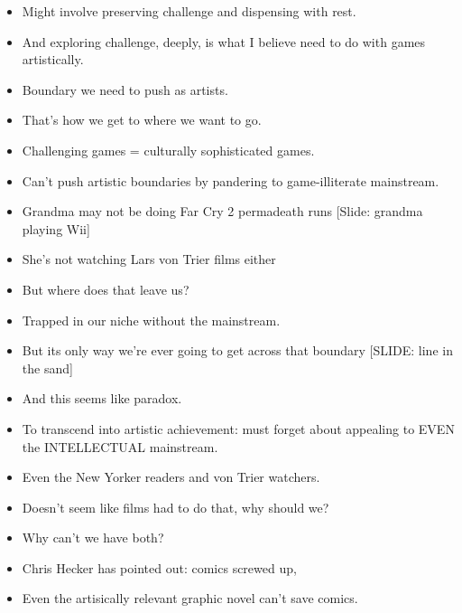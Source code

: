 \documentclass[12pt]{article}
\begin{document}
{\begin{itemize}
\item Might involve preserving challenge and dispensing with rest.

\item And exploring challenge, deeply, is what I believe need to do with games artistically.  

\item Boundary we need to push as artists.  

\item That's how we get to where we want to go.  

\item Challenging games = culturally sophisticated games.  

\item Can't push artistic boundaries by pandering to game-illiterate mainstream.  


\item Grandma may not be doing Far Cry 2 permadeath runs [Slide:  grandma playing Wii]

\item She's not watching Lars von Trier films either

\item But where does that leave us?  

\item Trapped in our niche without the mainstream.

\item But its only way we're ever going to get across that boundary [SLIDE: line in the sand]





\item And this seems like paradox.  

\item To transcend into artistic achievement:  must forget about appealing to EVEN the INTELLECTUAL mainstream.  

\item Even the New Yorker readers and von Trier watchers.

\item Doesn't seem like films had to do that, why should we?  

\item Why can't we have both?

\item Chris Hecker has pointed out:  comics screwed up, 

\item Even the artisically relevant graphic novel can't save comics.  


\end{itemize}}
\end{document}
